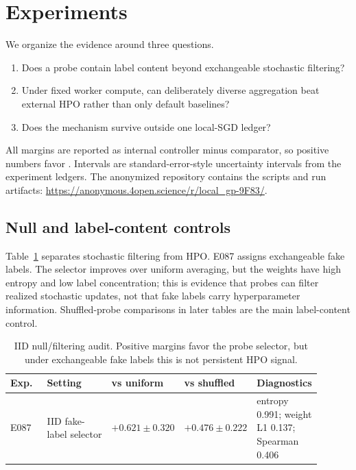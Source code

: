 \section{Experiments}
\label{sec:experiments}

We organize the evidence around three questions.

\begin{enumerate}
\item Does a probe contain label content beyond exchangeable stochastic
filtering?
\item Under fixed worker compute, can deliberately diverse aggregation beat
external HPO rather than only default baselines?
\item Does the mechanism survive outside one local-SGD ledger?
\end{enumerate}

All margins are reported as internal controller minus comparator, so positive
numbers favor \method. Intervals are standard-error-style uncertainty intervals
from the experiment ledgers. The anonymized repository contains the scripts and
run artifacts: \url{https://anonymous.4open.science/r/local_gp-9F83/}.

\subsection{Null and label-content controls}

Table~\ref{tab:null} separates stochastic filtering from HPO. E087 assigns
exchangeable fake labels. The selector improves over uniform averaging, but
the weights have high entropy and low label concentration; this is evidence
that probes can filter realized stochastic updates, not that fake labels carry
hyperparameter information. Shuffled-probe comparisons in later tables are the
main label-content control.

\begin{table}[t]
\centering
\small
\caption{IID null/filtering audit. Positive margins favor the probe selector,
but under exchangeable fake labels this is not persistent HPO signal.}
\label{tab:null}
\begin{tabular}{@{}p{0.14\linewidth}p{0.30\linewidth}p{0.17\linewidth}p{0.17\linewidth}p{0.12\linewidth}@{}}
\toprule
Exp. & Setting & vs uniform & vs shuffled & Diagnostics \\
\midrule
E087 & IID fake-label selector & $+0.621 \pm 0.320$ & $+0.476 \pm 0.222$ & entropy 0.991; weight L1 0.137; Spearman 0.406 \\
\bottomrule
\end{tabular}
\end{table}

